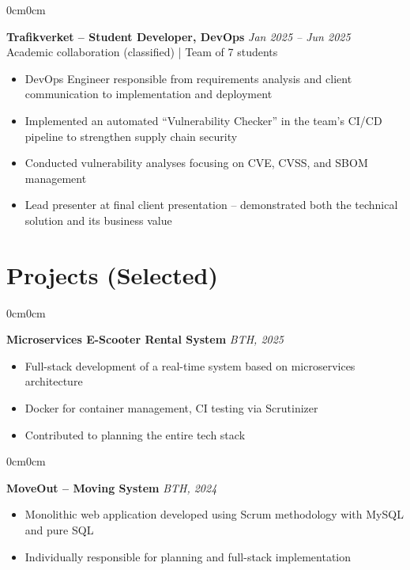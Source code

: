 \documentclass[10pt, letterpaper]{article}
\newenvironment{highlights}{
    \begin{itemize}[topsep=0.10cm, parsep=0.10cm, partopsep=0pt, itemsep=0pt, leftmargin=10pt]
}{
    \end{itemize}
}
\newenvironment{onecolentry}{
    \begin{adjustwidth}{0cm}{0cm}
}{
    \end{adjustwidth}
}
\begin{document}
    \vspace{0.3cm}

    \begin{onecolentry}
        \textbf{Trafikverket -- Student Developer, DevOps} \hfill \textit{Jan 2025 -- Jun 2025} \\
            Academic collaboration (classified) | Team of 7 students \\
        \begin{highlights}
            \item DevOps Engineer responsible from requirements analysis and client communication to implementation and deployment
            \item Implemented an automated ``Vulnerability Checker'' in the team's CI/CD pipeline to strengthen supply chain security
            \item Conducted vulnerability analyses focusing on CVE, CVSS, and SBOM management
            \item Lead presenter at final client presentation -- demonstrated both the technical solution and its business value
        \end{highlights}
    \end{onecolentry}

    \section{Projects (Selected)}

    \begin{onecolentry}
        \textbf{Microservices E-Scooter Rental System} \hfill \textit{BTH, 2025}
        \begin{highlights}
            \item Full-stack development of a real-time system based on microservices architecture
            \item Docker for container management, CI testing via Scrutinizer
            \item Contributed to planning the entire tech stack
        \end{highlights}
    \end{onecolentry}

    \vspace{0.2cm}

    \begin{onecolentry}
        \textbf{MoveOut -- Moving System} \hfill \textit{BTH, 2024}
        \begin{highlights}
            \item Monolithic web application developed using Scrum methodology with MySQL and pure SQL
            \item Individually responsible for planning and full-stack implementation
        \end{highlights}
    \end{onecolentry}
\end{document}
